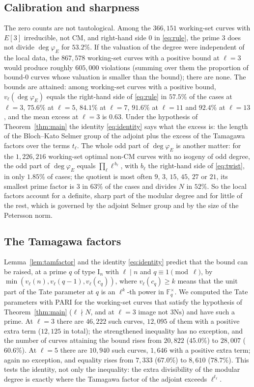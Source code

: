 \documentclass[11pt]{amsart}
\theoremstyle{definition}
\newcommand{\F}{\mathbb{F}}
\newcommand{\degphi}{\deg\varphi_E}
\newcommand{\Ns}{3\mathrm{Ns}}
\begin{document}
\subsection{Calibration and sharpness}\label{sec:sharp}
The zero counts are not tautological. Among the $366{,}151$ working-set curves with $E[3]$ irreducible, not CM, and right-hand side $0$ in \eqref{eq:rule}, the prime $3$ does not divide $\degphi$ for $53.2\%$. If the valuation of the degree were independent of the local data, the $867{,}578$ working-set curves with a positive bound at $\ell=3$ would produce roughly $605{,}000$ violations (summing over them the proportion of bound-$0$ curves whose valuation is smaller than the bound); there are none. The bounds are attained: among working-set curves with a positive bound, $v_\ell(\degphi)$ equals the right-hand side of \eqref{eq:rule} in $57.5\%$ of the cases at $\ell=3$, $75.6\%$ at $\ell=5$, $84.1\%$ at $\ell=7$, $91.6\%$ at $\ell=11$ and $92.4\%$ at $\ell=13$, and the mean excess at $\ell=3$ is $0.63$. Under the hypothesis of Theorem~\ref{thm:main} the identity \eqref{eq:identity} says what the excess is: the length of the Bloch--Kato Selmer group of the adjoint plus the excess of the Tamagawa factors over the terms $t_\ell$. The whole odd part of $\degphi$ is another matter: for the $1{,}226{,}216$ working-set optimal non-CM curves with no isogeny of odd degree, the odd part of $\degphi$ equals $\prod_\ell\ell^{\,b_\ell}$, with $b_\ell$ the right-hand side of \eqref{eq:twist}, in only $1.85\%$ of cases; the quotient is most often $9$, $3$, $15$, $45$, $27$ or $21$, its smallest prime factor is $3$ in $63\%$ of the cases and divides $N$ in $52\%$. So the local factors account for a definite, sharp part of the modular degree and for little of the rest, which is governed by the adjoint Selmer group and by the size of the Petersson norm.

\subsection{The Tamagawa factors}\label{sec:tam}
Lemma~\ref{lem:tamfactor} and the identity \eqref{eq:identity} predict that the bound can be raised, at a prime $q$ of type $\mathrm{I}_n$ with $\ell\mid n$ and $q\equiv1\pmod\ell$, by $\min(v_\ell(n),v_\ell(q-1),v_\ell(c_q))$, where $v_\ell(c_q)\ge k$ means that the unit part of the Tate parameter at $q$ is an $\ell^k$-th power in $\F_q^\times$. We computed the Tate parameters with PARI for the working-set curves that satisfy the hypothesis of Theorem~\ref{thm:main} ($\ell\nmid N$, and at $\ell=3$ image not $\Ns$) and have such a prime. At $\ell=3$ there are $46{,}222$ such curves, $12{,}095$ of them with a positive extra term ($12{,}125$ in total); the strengthened inequality has no exception, and the number of curves attaining the bound rises from $20{,}822$ ($45.0\%$) to $28{,}007$ ($60.6\%$). At $\ell=5$ there are $10{,}940$ such curves, $1{,}646$ with a positive extra term; again no exception, and equality rises from $7{,}333$ ($67.0\%$) to $8{,}610$ ($78.7\%$). This tests the identity, not only the inequality: the extra divisibility of the modular degree is exactly where the Tamagawa factor of the adjoint exceeds $\ell^{t_\ell}$.
\end{document}
